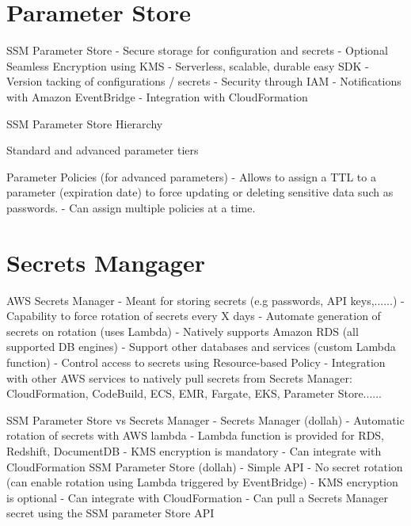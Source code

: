 \documentclass[11pt]{book}
\begin{document}
    \section{Parameter Store}
    SSM Parameter Store
    - Secure storage for configuration and secrets
    - Optional Seamless Encryption using KMS
    - Serverless, scalable, durable easy SDK
    - Version tacking of configurations / secrets
    - Security through IAM
    - Notifications with Amazon EventBridge
    - Integration with CloudFormation


    SSM Parameter Store Hierarchy


    Standard and advanced parameter tiers


    Parameter Policies (for advanced parameters)
    - Allows to assign a TTL to a parameter (expiration date) to force updating or deleting sensitive data such as passwords.
    - Can assign multiple policies at a time.



    \section{Secrets Mangager}
    AWS Secrets Manager
    - Meant for storing secrets (e.g passwords, API keys,......)
    - Capability to force rotation of secrets every X days
    - Automate generation of secrets on rotation (uses Lambda)
    - Natively supports Amazon RDS (all supported DB engines)
    - Support other databases and services (custom Lambda function)
    - Control access to secrets using Resource-based Policy
    - Integration with other AWS services to natively pull secrets from Secrets Manager: CloudFormation, CodeBuild, ECS, EMR, Fargate, EKS, Parameter Store......



    SSM Parameter Store vs Secrets Manager
    - Secrets Manager (dollah)
    - Automatic rotation of secrets with AWS lambda
    - Lambda function is provided for RDS, Redshift, DocumentDB
    - KMS encryption is mandatory
    - Can integrate with CloudFormation
    SSM Parameter Store (dollah)
    - Simple API
    - No secret rotation (can enable rotation using Lambda triggered by EventBridge)
    - KMS encryption is optional
    - Can integrate with CloudFormation
    - Can pull a Secrets Manager secret using the SSM parameter Store API
\end{document}
